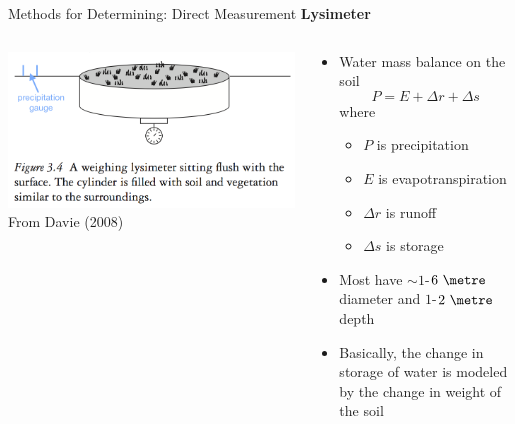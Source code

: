 \begin{frame}{Methods for Determining: Direct Measurement}
\textbf{Lysimeter}
\begin{columns}[T]
    \begin{column}{.4\textwidth}
    \begin{minipage}[c][0.7\textheight][c]{\linewidth}
    \includegraphics[width=1\textwidth]{fig1}\\
    \centering \small From Davie (2008)
    \end{minipage}
    \end{column}
    \begin{column}{.6\textwidth}
    \begin{minipage}[c][0.6\textheight][c]{\linewidth}
   \begin{itemize}
   	\item Water mass balance on the soil
   	$$P = E + \Delta r + \Delta s$$
   	where 
   	\begin{itemize}
   	\item $P$ is precipitation
   	\item $E$ is evapotranspiration
   	\item $\Delta r$ is runoff
   	\item $\Delta s$ is storage
   	\end{itemize}
   	\item Most have $\sim 1$-$6\ \metre$ diameter and $1$-$2\ \metre$ depth 
   	\item Basically, the change in storage of water is modeled by the change in weight of the soil
   \end{itemize}
      \end{minipage}
    \end{column}
  \end{columns}
\end{frame}

